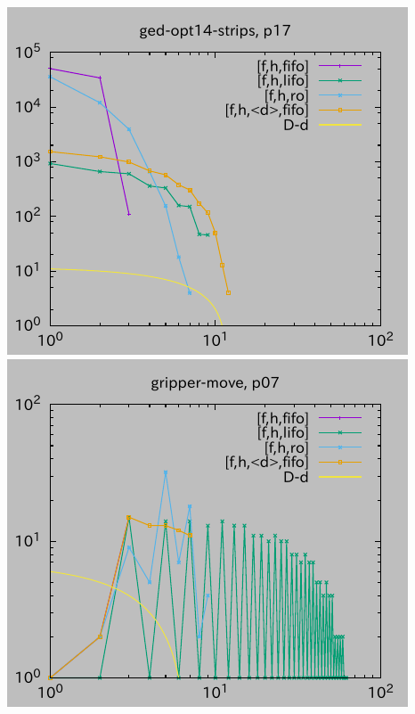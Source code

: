 \includegraphics{img/depth/ged-opt14-strips/p17.pdf}
\includegraphics{img/depth/gripper-move/p07.pdf}
